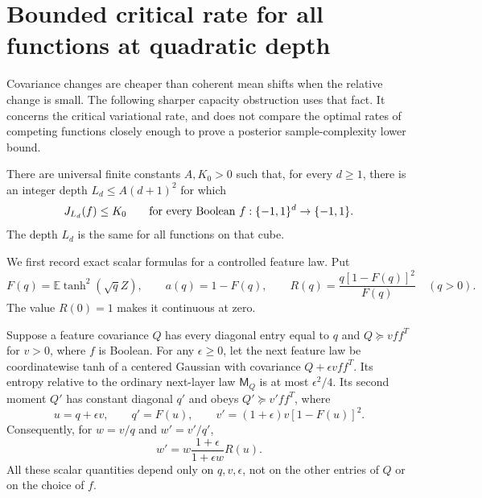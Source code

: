 \section{Bounded critical rate for all functions at quadratic depth}
\label{sec:critical-constant-rate}

Covariance changes are cheaper than coherent mean shifts when the
relative change is small. The following sharper capacity obstruction
uses that fact. It concerns the critical variational rate, and does not
compare the optimal rates of competing functions closely enough to
prove a posterior sample-complexity lower bound.

\begin{theorem}
\label{thm:critical-constant-rate}
There are universal finite constants $A,K_0>0$ such that, for every
$d\ge1$, there is an integer depth $L_d\le A(d+1)^2$ for which
\[
 J_{L_d}(f)\le K_0
 \qquad\hbox{for every Boolean }f:\{-1,1\}^d\to\{-1,1\}.
\]
The depth $L_d$ is the same for all functions on that cube.
\end{theorem}

We first record exact scalar formulas for a controlled feature law.
Put
\[
 F(q)=\mathbb E\tanh^2(\sqrt q Z),\qquad
 a(q)=1-F(q),\qquad
 R(q)=\frac{q[1-F(q)]^2}{F(q)}\quad(q>0).
\]
The value $R(0)=1$ makes it continuous at zero.

\begin{lemma}
\label{lem:rankone-critical-control}
Suppose a feature covariance $Q$ has every diagonal entry equal to $q$
and $Q\succeq vff^T$ for $v>0$, where $f$ is Boolean.
For any $\epsilon\ge0$, let the next feature law be coordinatewise tanh
of a centered Gaussian with covariance $Q+\epsilon vff^T$.
Its entropy relative to the ordinary next-layer law $\mathsf M_Q$ is
at most $\epsilon^2/4$. Its second moment $Q'$ has constant diagonal
$q'$ and obeys $Q'\succeq v'ff^T$, where
\begin{equation}\label{eq:critical-covariance-control}
 u=q+\epsilon v,\qquad
 q'=F(u),\qquad v'=(1+\epsilon)v[1-F(u)]^2.
\end{equation}
Consequently, for $w=v/q$ and $w'=v'/q'$,
\[
 w'=w\frac{1+\epsilon}{1+\epsilon w}R(u).
\]
All these scalar quantities depend only on $q,v,\epsilon$, not on the
other entries of $Q$ or on the choice of $f$.
\end{lemma}

